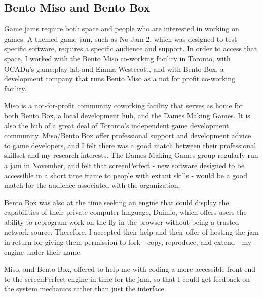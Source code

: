 \subsection{Bento Miso and Bento Box}
Game jams require both space and people who are interested in working on games. A themed game jam, such as No Jam 2, which was designed to test specific software, requires a specific audience and support. In order to access that space, I worked with the Bento Miso co-working facility in Toronto, with OCADu's game:play lab and Emma Westecott, and with Bento Box, a development company that runs Bento Miso as a not for profit co-working facility.

Miso is a not-for-profit community coworking facility that serves as home for both Bento Box, a local development hub, and the Dames Making Games. It is also the hub of a great deal of Toronto's independent game development community. Miso/Bento Box offer professional support and development advice to game developers, and I felt there was a good match between their professional skillset and my research interests. The Dames Making Games group regularly run a jam in November, and felt that screenPerfect - new software designed to be accessible in a short time frame to people with extant skills - would be a good match for the audience associated with the organization. 

Bento Box was also at the time seeking an engine that could display the capabilities of their private computer language, Daimio, which offers users the ability to reprogram work on the fly in the browser without being a trusted network source. Therefore, I accepted their help and their offer of hosting the jam in return for giving them permission to fork - copy, reproduce, and extend - my engine under their name. 

Miso, and Bento Box, offered to help me with coding a more accessible front end to the screenPerfect engine in time for the jam, so that I could get feedback on the system mechanics rather than just the interface. 

